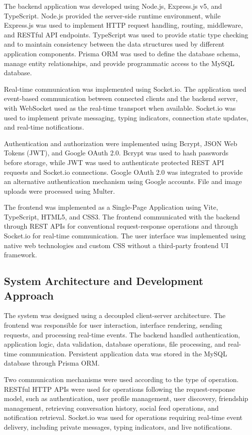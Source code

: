 \documentclass[12pt, a4paper]{article}
\begin{document}
The backend application was developed using Node.js, Express.js v5, and TypeScript. Node.js provided the server-side runtime environment, while Express.js was used to implement HTTP request handling, routing, middleware, and RESTful API endpoints. TypeScript was used to provide static type checking and to maintain consistency between the data structures used by different application components. Prisma ORM was used to define the database schema, manage entity relationships, and provide programmatic access to the MySQL database.

Real-time communication was implemented using Socket.io. The application used event-based communication between connected clients and the backend server, with WebSocket used as the real-time transport when available. Socket.io was used to implement private messaging, typing indicators, connection state updates, and real-time notifications.

Authentication and authorization were implemented using Bcrypt, JSON Web Tokens (JWT), and Google OAuth 2.0. Bcrypt was used to hash passwords before storage, while JWT was used to authenticate protected REST API requests and Socket.io connections. Google OAuth 2.0 was integrated to provide an alternative authentication mechanism using Google accounts. File and image uploads were processed using Multer.

The frontend was implemented as a Single-Page Application using Vite, TypeScript, HTML5, and CSS3. The frontend communicated with the backend through REST APIs for conventional request-response operations and through Socket.io for real-time communication. The user interface was implemented using native web technologies and custom CSS without a third-party frontend UI framework.


\subsection{System Architecture and Development Approach}

The system was designed using a decoupled client-server architecture. The frontend was responsible for user interaction, interface rendering, sending requests, and processing real-time events. The backend handled authentication, application logic, data validation, database operations, file processing, and real-time communication. Persistent application data was stored in the MySQL database through Prisma ORM.

Two communication mechanisms were used according to the type of operation. RESTful HTTP APIs were used for operations following the request-response model, such as authentication, user profile management, user discovery, friendship management, retrieving conversation history, social feed operations, and notification retrieval. Socket.io was used for operations requiring real-time event delivery, including private messages, typing indicators, and live notifications.
\end{document}
